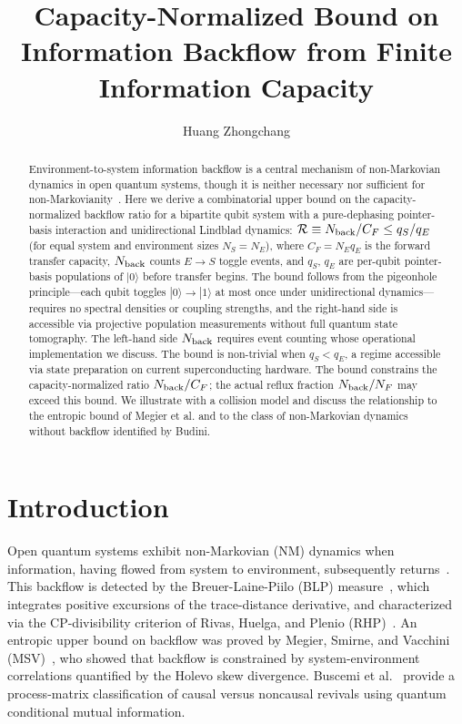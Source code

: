 \documentclass[aps,pra,twocolumn,superscriptaddress,floatfix]{revtex4-2}
\begin{document}
\title{Capacity-Normalized Bound on Information Backflow from Finite Information Capacity}

\author{Huang Zhongchang}

\begin{abstract}
Environment-to-system information backflow is a central mechanism of non-Markovian dynamics in open quantum systems, though it is neither necessary nor sufficient for non-Markovianity~\cite{Budini:2018}. Here we derive a combinatorial upper bound on the capacity-normalized backflow ratio for a bipartite qubit system with a pure-dephasing pointer-basis interaction and unidirectional Lindblad dynamics: $\mathcal{R} \equiv N_{\rm back}/C_F \leq q_S/q_E$ (for equal system and environment sizes $N_S=N_E$), where $C_F = N_E q_E$ is the forward transfer capacity, $N_{\rm back}$ counts $E \to S$ toggle events, and $q_S$, $q_E$ are per-qubit pointer-basis populations of $|0\rangle$ before transfer begins. The bound follows from the pigeonhole principle---each qubit toggles $|0\rangle \to |1\rangle$ at most once under unidirectional dynamics---requires no spectral densities or coupling strengths, and the right-hand side is accessible via projective population measurements without full quantum state tomography. The left-hand side $N_{\rm back}$ requires event counting whose operational implementation we discuss. The bound is non-trivial when $q_S < q_E$, a regime accessible via state preparation on current superconducting hardware. The bound constrains the capacity-normalized ratio $N_{\rm back}/C_F$; the actual reflux fraction $N_{\rm back}/N_F$ may exceed this bound. We illustrate with a collision model and discuss the relationship to the entropic bound of Megier et al. and to the class of non-Markovian dynamics without backflow identified by Budini.
\end{abstract}

\maketitle

\section{Introduction}

Open quantum systems exhibit non-Markovian (NM) dynamics when information, having flowed from system to environment, subsequently returns~\cite{Breuer:2016}. This backflow is detected by the Breuer-Laine-Piilo (BLP) measure~\cite{Breuer:2009}, which integrates positive excursions of the trace-distance derivative, and characterized via the CP-divisibility criterion of Rivas, Huelga, and Plenio (RHP)~\cite{Rivas:2010}. An entropic upper bound on backflow was proved by Megier, Smirne, and Vacchini (MSV)~\cite{Megier:2021}, who showed that backflow is constrained by system-environment correlations quantified by the Holevo skew divergence. Buscemi et al.~\cite{Buscemi:2025} provide a process-matrix classification of causal versus noncausal revivals using quantum conditional mutual information.
\end{document}
